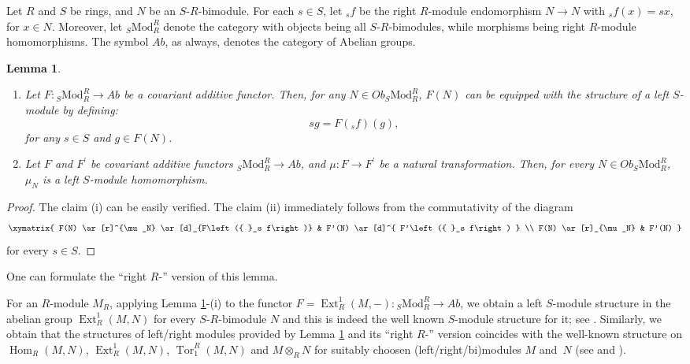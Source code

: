 \documentclass[11pt,a4paper]{amsart}
\theoremstyle{plain}
\newtheorem{lemma}[theorem]{Lemma}
\theoremstyle{definition}
\theoremstyle{remark}
\newcommand{\parantezicindeenumi}[1][\roman]{\renewcommand{\theenumi}{#1{enumi}}
\renewcommand{\labelenumi}{(\theenumi)} }
\newcommand{\Ext}{\operatorname{Ext}}
\begin{document}
Let $R$ and $S$ be rings, and $N$ be an $S$-$R$-bimodule. For each $ s\in S $, let ${ }_s f$ be the right $R$-module endomorphism $N \rightarrow N$ with ${ }_s f(x)=s x$, for $x \in N$. Moreover, let ${ }_S \mathrm{Mod}_R^R$ denote the category with objects being all $S$-$R$-bimodules, while morphisms being right $R$-module homomorphisms. The symbol ${Ab}$, as always, denotes the category of Abelian groups.



\begin{lemma}\label{Lemma:ModuleStructureOnExtHomeTensoretc}
\begin{enumerate}\parantezicindeenumi
 \item Let $F:{ }_S \mathrm{Mod}_R^R \rightarrow A b$ be a covariant additive functor. Then, for any $N \in O b  { }_S \mathrm{Mod}_R^R$, $F(N)$ can be equipped with the structure of a left $S$-module by defining:
\[
s g=F\left({ }_s f\right)(g),
\]
for any $s \in S$ and $g \in F(N)$.

\item Let $F$ and $F^{\prime}$ be covariant additive functors ${ }_S \mathrm{Mod}_R^R \rightarrow A b$, and $\mu: F \rightarrow F^{\prime}$ be a natural transformation. Then, for every $N \in O b{ }_S \mathrm{Mod}_R^R$,  $\mu_N$ is a left $S$-module homomorphism.
\end{enumerate}
\end{lemma}
\begin{proof}
 The claim (i) can be easily verified. The claim (ii) immediately follows from the commutativity of the diagram
\[
\xymatrix{
F(N) \ar[r]^{\mu_N} \ar[d]_{F\left({ }_s f\right)} & F'(N)
\ar[d]^{ F'\left({ }_s f\right) } \\
F(N) \ar[r]_{\mu_N} &  F'(N)
}
\]
for every $ s\in S $.
\end{proof}



One can formulate the ``right $R$-'' version of this lemma. 

For an $R$-module $ M_R $, applying Lemma \ref{Lemma:ModuleStructureOnExtHomeTensoretc}-(i) to the functor
 $ F= \Ext^1_R(M,-):{ }_S \mathrm{Mod}_R^R \rightarrow A b $, we obtain a left $ S $-module structure in the abelian group $ \Ext^1_R(M,N) $ for every $S$-$R$-bimodule $ N $ and this is indeed the well known $ S $-module structure for it; see \cite[Theorem V.2.1 and \S V.3, p.144, Eqn. (3.4)]{Maclane:Homology}. Similarly, we obtain that
the structures of left/right modules provided by Lemma \ref{Lemma:ModuleStructureOnExtHomeTensoretc} and its ``right $R$-'' version coincides with the well-known structure on $\operatorname{Hom}_R(M, N)$, $ \Ext^1_R(M,N) $, $ \operatorname{Tor}_1^R(M, N)$ and
 $ M \otimes_R N$ for suitably choosen (left/right/bi)modules $ M $ and~$ N $ (see \cite[\S V.3]{Maclane:Homology} and \cite[\S 2.6, the paragraph after Definition 2.6.4]{Weibel:HomologicalAlgebra}).
\end{document}
